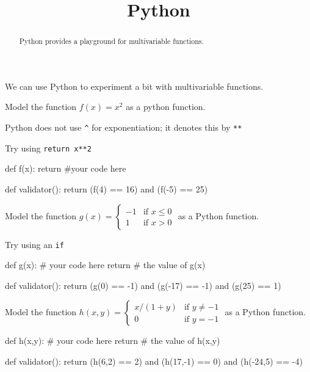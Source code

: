 \documentclass{ximera}
\title{Python}
\begin{document}
\begin{abstract}
  Python provides a playground for multivariable functions.
\end{abstract}
\maketitle

We can use Python to experiment a bit with multivariable functions.

\begin{question}
  \begin{solution}
    Model the function $f(x) = x^2$ as a python function.

    \begin{hint}
    \begin{warning}
      Python does not use \verb|^| for exponentiation; it denotes this by \verb|**|
    \end{warning}
    \end{hint}

    \begin{hint}
      Try using \verb|return x**2|
    \end{hint}
    \begin{python}
def f(x):
  return #your code here

def validator():
  return (f(4) == 16) and (f(-5) == 25)
    \end{python}
  \end{solution}

  \begin{solution}
    Model the function \(g(x)=\begin{cases} -1 & \text{if $x \leq 0$} \\ 1 & \text{if $x>0$}\end{cases}\) as a Python function.

    \begin{hint}
      Try using an \verb|if|
    \end{hint}

    \begin{python}
def g(x):
  # your code here
  return # the value of g(x)

def validator():
  return (g(0) == -1) and (g(-17) == -1) and (g(25) == 1)
    \end{python}
  \end{solution}


  \begin{solution}
Model the function \(h(x,y) = \begin{cases} x/(1+y) & \text{if $y \neq -1$} \\ 0 & \text{if $y = -1$}\end{cases}\) as a Python function.

    \begin{python}
def h(x,y):
  # your code here
  return # the value of h(x,y)

def validator():
  return (h(6,2) == 2) and (h(17,-1) == 0) and (h(-24,5) == -4)
    \end{python}
  \end{solution}
\end{question}
	
\end{document}
